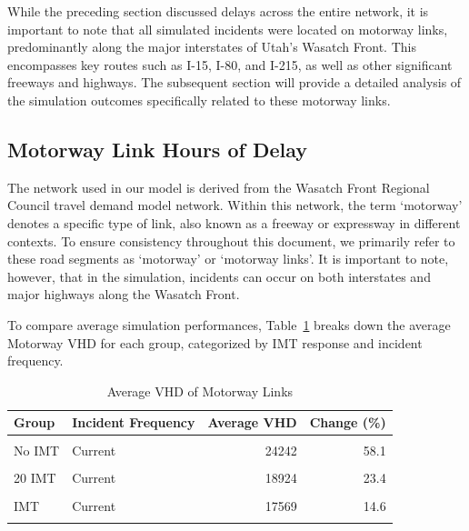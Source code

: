 \documentclass[fancy, oneside, mastersfancy, ms]{byuthesis}
\begin{document}
While the preceding section discussed delays across the entire network,
it is important to note that all simulated incidents were located on
motorway links, predominantly along the major interstates of Utah's
Wasatch Front. This encompasses key routes such as I-15, I-80, and
I-215, as well as other significant freeways and highways. The
subsequent section will provide a detailed analysis of the simulation
outcomes specifically related to these motorway links.

\hypertarget{motorway-link-hours-of-delay}{%
\subsection{Motorway Link Hours of
Delay}\label{motorway-link-hours-of-delay}}

The network used in our model is derived from the Wasatch Front Regional
Council travel demand model network. Within this network, the term
`motorway' denotes a specific type of link, also known as a freeway or
expressway in different contexts. To ensure consistency throughout this
document, we primarily refer to these road segments as `motorway' or
`motorway links'. It is important to note, however, that in the
simulation, incidents can occur on both interstates and major highways
along the Wasatch Front.

To compare average simulation performances,
Table~\ref{tbl-motorway_delays_table} breaks down the average Motorway
VHD for each group, categorized by IMT response and incident frequency.

\hypertarget{tbl-motorway_delays_table}{}
\begin{table}
\caption{\label{tbl-motorway_delays_table}Average VHD of Motorway Links }\tabularnewline

\centering
\begin{tabular}[t]{llrr}
\toprule
\textbf{Group} & \textbf{Incident Frequency} & \textbf{Average VHD} & \textbf{Change (\%)}\\
\midrule
\cellcolor{gray!6}{Baseline} & \cellcolor{gray!6}{-} & \cellcolor{gray!6}{15335} & \cellcolor{gray!6}{0.0}\\
No IMT & Current & 24242 & 58.1\\
\cellcolor{gray!6}{No IMT} & \cellcolor{gray!6}{Increased} & \cellcolor{gray!6}{22321} & \cellcolor{gray!6}{45.6}\\
20 IMT & Current & 18924 & 23.4\\
\cellcolor{gray!6}{20 IMT} & \cellcolor{gray!6}{Increased} & \cellcolor{gray!6}{19176} & \cellcolor{gray!6}{25.0}\\
\addlinespace
30 IMT & Current & 17569 & 14.6\\
\cellcolor{gray!6}{30 IMT} & \cellcolor{gray!6}{Increased} & \cellcolor{gray!6}{18327} & \cellcolor{gray!6}{19.5}\\
\bottomrule
\end{tabular}
\end{table}
\end{document}

